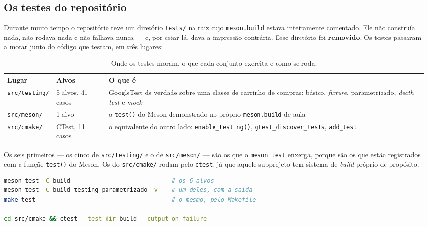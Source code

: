 \subsection{Os testes do repositório}
\label{sec:testes-do-repo}

Durante muito tempo o repositório teve um diretório \texttt{tests/} na raiz cujo
\texttt{meson.build} estava inteiramente comentado. Ele não construía nada, não
rodava nada e não falhava nunca --- e, por estar lá, dava a impressão contrária.
Esse diretório foi \textbf{removido}. Os testes passaram a morar junto do código
que testam, em três lugares:

\begin{table}[htbp]
\centering
\caption{Onde os testes moram, o que cada conjunto exercita e como se roda.}
\label{tab:testes}
\footnotesize
\begin{tabular}{@{}llp{}@{}}
\toprule
\textbf{Lugar} & \textbf{Alvos} & \textbf{O que é} \\
\midrule
\texttt{src/testing/}
    & 5 alvos, 41 casos
    & GoogleTest de verdade sobre uma classe de carrinho de compras: básico,
      \emph{fixture}, parametrizado, \emph{death test} e \emph{mock} \\
\texttt{src/meson/}
    & 1 alvo
    & o \texttt{test()} do Meson demonstrado no próprio \texttt{meson.build}
      de aula \\
\texttt{src/cmake/}
    & CTest, 11 casos
    & o equivalente do outro lado: \texttt{enable\_testing()},
      \texttt{gtest\_discover\_tests}, \texttt{add\_test} \\
\bottomrule
\end{tabular}
\end{table}

Os seis primeiros --- os cinco de \texttt{src/testing/} e o de
\texttt{src/meson/} --- são os que o \texttt{meson test} enxerga, porque são os
que estão registrados com a função \texttt{test()} do Meson. Os do
\texttt{src/cmake/} rodam pelo \texttt{ctest}, já que aquele subprojeto tem
sistema de \emph{build} próprio de propósito.

\begin{lstlisting}[style=bt, language=bash,
    caption={Rodando os testes.}]
meson test -C build                             # os 6 alvos
meson test -C build testing_parametrizado -v    # um deles, com a saida
make test                                       # o mesmo, pelo Makefile

cd src/cmake && ctest --test-dir build --output-on-failure
\end{lstlisting}

